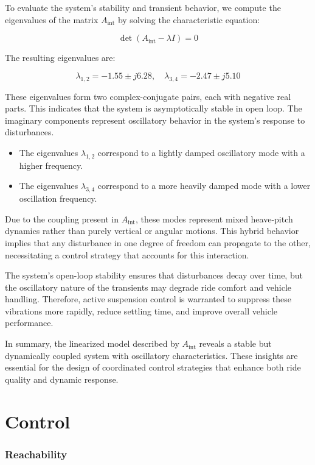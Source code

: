 \documentclass[]{report}
\begin{document}
	To evaluate the system's stability and transient behavior, we compute the eigenvalues of the matrix \( A_{\text{int}} \) by solving the characteristic equation:
	
	\[
	\det(A_{\text{int}} - \lambda I) = 0
	\]
	
	The resulting eigenvalues are:
	
	\[
	\lambda_{1,2} = -1.55 \pm j6.28, \quad \lambda_{3,4} = -2.47 \pm j5.10
	\]
	
	These eigenvalues form two complex-conjugate pairs, each with negative real parts. This indicates that the system is asymptotically stable in open loop. The imaginary components represent oscillatory behavior in the system's response to disturbances.
	
	\begin{itemize}
		\item The eigenvalues \( \lambda_{1,2} \) correspond to a lightly damped oscillatory mode with a higher frequency.
		\item The eigenvalues \( \lambda_{3,4} \) correspond to a more heavily damped mode with a lower oscillation frequency.
	\end{itemize}
	
	Due to the coupling present in \( A_{\text{int}} \), these modes represent mixed heave-pitch dynamics rather than purely vertical or angular motions. This hybrid behavior implies that any disturbance in one degree of freedom can propagate to the other, necessitating a control strategy that accounts for this interaction.
	
	The system’s open-loop stability ensures that disturbances decay over time, but the oscillatory nature of the transients may degrade ride comfort and vehicle handling. Therefore, active suspension control is warranted to suppress these vibrations more rapidly, reduce settling time, and improve overall vehicle performance.
	
	In summary, the linearized model described by \( A_{\text{int}} \) reveals a stable but dynamically coupled system with oscillatory characteristics. These insights are essential for the design of coordinated control strategies that enhance both ride quality and dynamic response.
	
	
	
	\newpage
	\section{Control}
	
	\subsubsection{Reachability}
	
\end{document}
